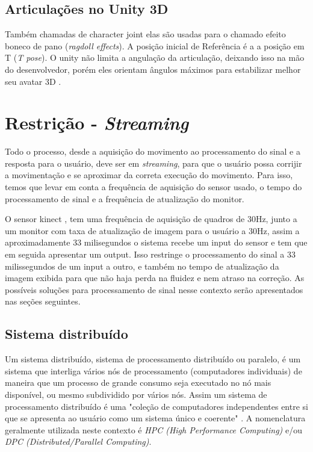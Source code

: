 \begin{table}[H]
\begin{tabular}{|c|c|c|}
   \end{tabular}
   \end{table}


  \subsection{Articulações no Unity 3D}
  \label{sec:Articulacoes no Unity 3D}
    Também chamadas de character joint elas são usadas para o chamado efeito
  boneco de pano (\textit{ragdoll effects}). A posição inicial de Referência é a
  a posição em T (\textit{T pose}). O unity não limita a angulação da articulação,
  deixando isso na mão do desenvolvedor, porém eles orientam ângulos máximos
  para estabilizar melhor seu avatar 3D \cite{unity3DManual}.

  \section{Restrição - \textit{Streaming}}
  \label{sec:restrição}
    Todo o processo, desde a aquisição do movimento ao processamento do sinal e a
  resposta para o usuário, deve ser em \textit{streaming}, para que o usuário possa corrijir a movimentação e se
  aproximar da correta execução do movimento. Para isso, temos que levar em conta
  a frequência de aquisição do sensor usado, o tempo do processamento de sinal e
  a frequência de atualização do monitor.

    O sensor kinect \cite{microsoftResearch}, tem uma frequência de
  aquisição de quadros de 30Hz, junto a um monitor com taxa de atualização de imagem
  para o usuário a 30Hz, assim a aproximadamente 33 milisegundos o
  sistema recebe um input do sensor e tem que em seguida apresentar um output. Isso restringe o processamento do sinal a 33 milissegundos de um input a outro, e
  também no tempo de atualização da imagem exibida para que não haja perda na
  fluidez e nem atraso na correção. As possíveis soluções para processamento de sinal nesse contexto serão apresentados nas seções seguintes.

  \subsection{Sistema distribuído}\label{distribuirProcessamento}
  Um sistema distribuído, sistema de processamento distribuído ou paralelo, é um sistema que interliga vários nós de processamento (computadores individuais) de maneira que um processo de grande consumo seja executado no nó mais disponível, ou mesmo subdividido por vários nós. Assim um sistema de processamento distribuído é uma "coleção de computadores independentes entre si que se apresenta ao usuário como um sistema único e coerente" \cite{tanenbaum}. A nomenclatura geralmente utilizada neste contexto é \textit{HPC (High Performance Computing)} e/ou \textit{DPC (Distributed/Parallel Computing)}.

